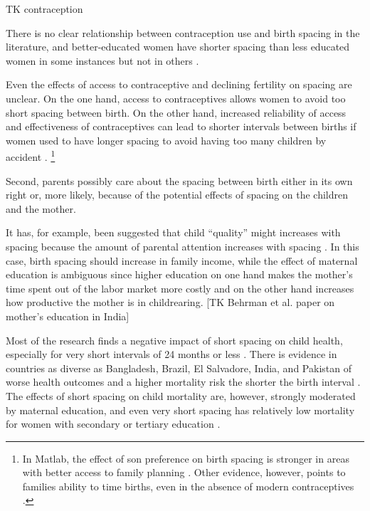 TK contraception

There is no clear relationship between contraception use and birth spacing in the 
literature, and better-educated women have shorter spacing than less educated women in 
some instances but not in others 
\citep{Tulasidhar1993,Whitworth2002,Bhalotra2008,Yeakey2009,Kim2010,Soest2018}.


Even the effects of access to contraceptive and declining fertility on spacing are unclear.
On the one hand, access to contraceptives allows women to avoid too short spacing between 
birth.
On the other hand, increased reliability of access and effectiveness of contraceptives can 
lead to shorter intervals between births if women used to have longer spacing to avoid
having too many children by accident \citep{Keyfitz1971,Heckman1976}.
%
\footnote{
In Matlab, the effect of son preference on birth spacing is stronger in areas with better 
access to family planning \citep{Rahman1993}.
Other evidence, however, points to families ability to time births, even in the absence
of modern contraceptives \citep{Jayachandran2011,Alam2018}.
}





Second, parents possibly care about the spacing between birth either in its own right or, 
more likely, because of the potential effects of spacing on the children and the mother.

It has, for example, been suggested that child ``quality'' might increases with spacing 
because the amount of parental attention increases with spacing
\citep{Zajonc1975,Zajonc1976,Razin1980}.
In this case, birth spacing should increase in family income, while the effect of maternal 
education is ambiguous since higher education on one hand makes the mother's time spent 
out of the labor market more costly and on the other hand increases how productive the 
mother is in childrearing. [TK Behrman et al. paper on mother's education in India]


Most of the research finds a negative impact of short spacing on child health, especially 
for very short intervals of 24 months or less 
\citep{Conde-Agudelo2006,Conde-Agudelo2012,Molitoris2019}.
There is evidence in countries as diverse as Bangladesh, Brazil, El Salvadore, India,
and Pakistan of worse health outcomes and a higher mortality risk the shorter the birth
interval
\citep{Cleland1984,Curtis1993,Whitworth2002,Bhargava2003,Rutstein2005,Bhalotra2008,Davanzo2008,Maitra2008,Makepeace2008,Gribble2009,Jayachandran2011,Saha2013,Jayachandran2017a,Ghosh2018}.
The effects of short spacing on child mortality are, however, strongly moderated by
maternal education, and even very short spacing has relatively low mortality for women
with secondary or tertiary education \citep{Molitoris2019}.

